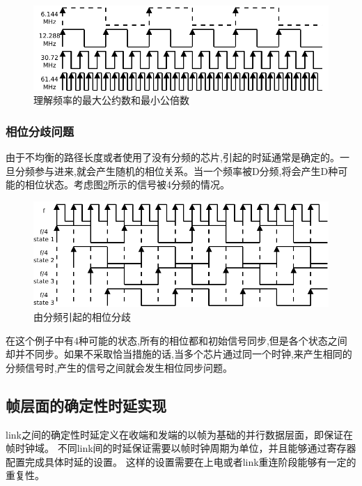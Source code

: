 \documentclass[UTF8]{ctexart}
\begin{document}
\begin{figure}[H]
\centering
\includegraphics[width=18cm]{./img/understanding_lcm_gcd_frequencies.pdf}
\caption{理解频率的最大公约数和最小公倍数}
\label{fig:understanding_lcm_gcd_frequencies}
\end{figure}

\subsubsection{相位分歧问题}

由于不均衡的路径长度或者使用了没有分频的芯片,引起的时延通常是确定的。一旦分频参与进来,就会产生随机的相位关系。当一个频率被D分频,将会产生D种可能的相位状态。考虑图\ref{fig:ambiguous_phase_produced_by_division}所示的信号被4分频的情况。

\begin{figure}[H]
\centering
\includegraphics[width=18cm]{./img/ambiguous_phase_produced_by_division.pdf}
\caption{由分频引起的相位分歧}
\label{fig:ambiguous_phase_produced_by_division}
\end{figure}

在这个例子中有4种可能的状态,所有的相位都和初始信号同步,但是各个状态之间却并不同步。如果不采取恰当措施的话,当多个芯片通过同一个时钟,来产生相同的分频信号时,产生的信号之间就会发生相位同步问题。

\subsection{帧层面的确定性时延实现}

link之间的确定性时延定义在收端和发端的以帧为基础的并行数据层面，即保证在帧时钟域。
不同link间的时延保证需要以帧时钟周期为单位，并且能够通过寄存器配置完成具体时延的设置。
这样的设置需要在上电或者link重连阶段能够有一定的重复性。
\end{document}
